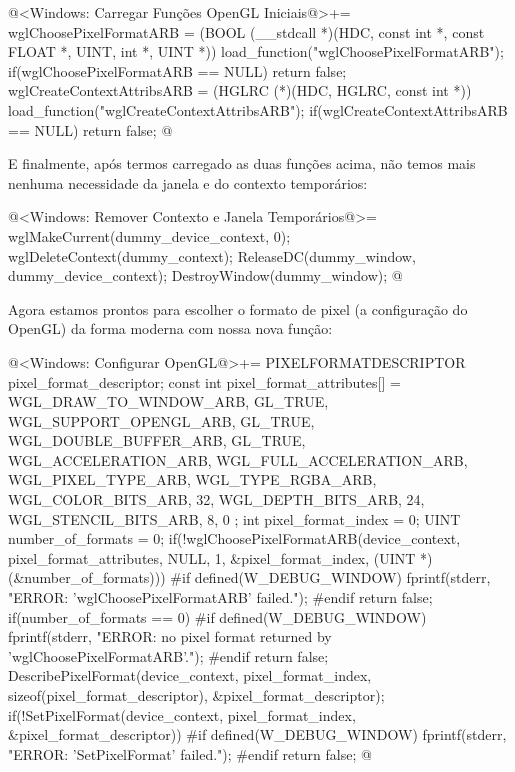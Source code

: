 \iniciocodigo
@<Windows: Carregar Funções OpenGL Iniciais@>+=
wglChoosePixelFormatARB = (BOOL (__stdcall *)(HDC, const int *, const FLOAT *,
                                              UINT, int *, UINT *))
                          load_function("wglChoosePixelFormatARB");
if(wglChoosePixelFormatARB == NULL) return false;
wglCreateContextAttribsARB = (HGLRC (*)(HDC, HGLRC, const int *))
                               load_function("wglCreateContextAttribsARB");
if(wglCreateContextAttribsARB == NULL) return false;
@
\fimcodigo

E finalmente, após termos carregado as duas funções acima, não temos
mais nenhuma necessidade da janela e do contexto temporários:

\iniciocodigo
@<Windows: Remover Contexto e Janela Temporários@>=
wglMakeCurrent(dummy_device_context, 0);
wglDeleteContext(dummy_context);
ReleaseDC(dummy_window, dummy_device_context);
DestroyWindow(dummy_window);
@
\fimcodigo

Agora estamos prontos para escolher o formato de pixel (a configuração
do OpenGL) da forma moderna com nossa nova função:

\iniciocodigo
@<Windows: Configurar OpenGL@>+=
{
  PIXELFORMATDESCRIPTOR pixel_format_descriptor;
  const int pixel_format_attributes[] = {
    WGL_DRAW_TO_WINDOW_ARB, GL_TRUE,
    WGL_SUPPORT_OPENGL_ARB, GL_TRUE,
    WGL_DOUBLE_BUFFER_ARB, GL_TRUE,
    WGL_ACCELERATION_ARB, WGL_FULL_ACCELERATION_ARB,
    WGL_PIXEL_TYPE_ARB, WGL_TYPE_RGBA_ARB,
    WGL_COLOR_BITS_ARB, 32,
    WGL_DEPTH_BITS_ARB, 24,
    WGL_STENCIL_BITS_ARB, 8,
    0 };
  int pixel_format_index = 0;
  UINT number_of_formats = 0;
  if(!wglChoosePixelFormatARB(device_context, pixel_format_attributes, NULL, 1,
                              &pixel_format_index,
                              (UINT *) (&number_of_formats))){
#if defined(W_DEBUG_WINDOW)
     fprintf(stderr, "ERROR: 'wglChoosePixelFormatARB' failed.\n");
#endif
     return false;
  }
  if(number_of_formats == 0){
#if defined(W_DEBUG_WINDOW)
     fprintf(stderr,
             "ERROR: no pixel format returned by 'wglChoosePixelFormatARB'.\n");
#endif
     return false;
  }
  DescribePixelFormat(device_context, pixel_format_index,
                      sizeof(pixel_format_descriptor), &pixel_format_descriptor);
  if(!SetPixelFormat(device_context, pixel_format_index,
                     &pixel_format_descriptor)){
#if defined(W_DEBUG_WINDOW)
    fprintf(stderr, "ERROR: 'SetPixelFormat' failed.\n");
#endif
    return false;
  }
}
@
\fimcodigo

